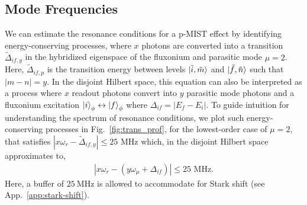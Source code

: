 \documentclass[%
reprint,
superscriptaddress,
 amsmath,amssymb,
 aps,
 prx,
longbibliography,
floatfix,
]{revtex4-2}
\begin{document}
\subsection{Mode Frequencies}\label{mode-frequencies}
 We can estimate the resonance conditions for a p-MIST effect by identifying  energy-conserving processes, where $x$ photons are converted into a transition $\tilde{\Delta}_{if,y}$ in the hybridized eigenspace of the fluxonium and parasitic mode $\mu=2$. Here, $\tilde{\Delta}_{if,p}$ is the transition energy between levels $\ket{\tilde{i},\tilde{m}}$ and $\ket{\tilde{f},\tilde{n}}$ such that $|m-n|=y$. In the disjoint Hilbert space, this equation can also be interpreted as a process where $x$ readout photons convert into $y$ parasitic mode photons and a fluxonium excitation $\ket{i}_\phi \leftrightarrow \ket{f}_\phi$ where $\Delta_{if}=|E_f-E_i|$. To guide intuition for understanding the spectrum of resonance conditions, we plot such energy-conserving processes in Fig.~\ref{fig:trans_prof}, for the lowest-order case of $\mu=2$, that satisfies $|x\omega_r-\tilde{\Delta}_{if,y}|\le 25 \textrm{ MHz}$ which, in the disjoint Hilbert space approximates to,
\begin{align}
|x\omega_r-(y\omega_\mu+\Delta_{if})|\le 25 \textrm{ MHz}.
\label{eq:En_cons}
\end{align}
Here, a buffer of $25 \ \mathrm{MHz}$ is allowed to accommodate for Stark shift (see App.~\ref{app:stark-shift}).
\end{document}
